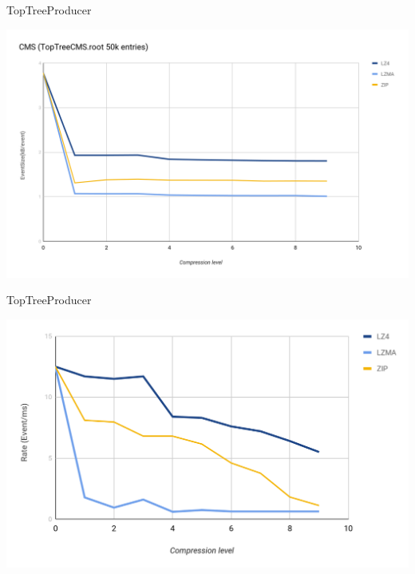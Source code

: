 \documentclass[aspectratio=169]{beamer}
\begin{document}
\begin{frame}{TopTreeProducer}
\vspace{0.1 cm}
\begin{center}
\includegraphics[width=0.9\linewidth]{tp-eventsize.png}
\end{center}
\end{frame}

\begin{frame}{TopTreeProducer}
\vspace{0.1 cm}
\begin{center}
\includegraphics[width=0.9\linewidth]{tp-eventrate.png}
\end{center}
\end{frame}
\end{document}
